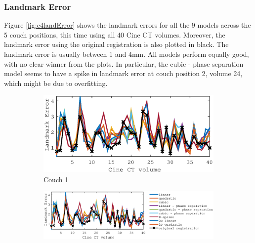\documentclass[11pt,a4paper,oneside]{report}
\begin{document}
\subsubsection*{Landmark Error}

Figure \ref{fig:c4landError} shows the landmark errors for all the 9 models across the 5 couch positions, this time using all 40 Cine CT volumes. Moreover, the landmark error using the original registration is also plotted in black. The landmark error is usually between 1 and 4mm. All models perform equally good, with no clear winner from the plots. In particular, the cubic - phase separation model seems to have a spike in landmark error at couch position 2, volume 24, which might be due to overfitting. 

\begin{figure}[H]
  \begin{subfigure}[b]{0.5\textwidth}
    \includegraphics[width=\textwidth, trim=0 0 0 0,clip=true]{figures/task4/landmark_error_couch1.eps}
    \caption{Couch 1}
  \end{subfigure}%
  \begin{subfigure}[b]{0.32\textwidth}
    \includegraphics[width=\textwidth, trim=410 0 0 0,clip=true]{figures/task4/landmark_error_legend.eps}\\
  \end{subfigure}%
  

\end{figure}
\end{document}
